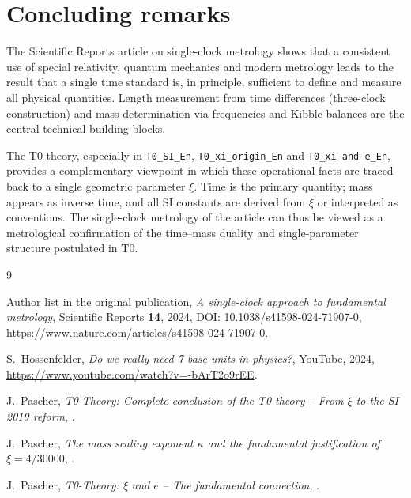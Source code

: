 \section{Concluding remarks}

The Scientific Reports article on single-clock metrology shows that a
consistent use of special relativity, quantum mechanics and modern metrology
leads to the result that a single time standard is, in principle, sufficient to
define and measure all physical quantities. Length measurement from time
differences (three-clock construction) and mass determination via frequencies
and Kibble balances are the central technical building blocks.

The T0 theory, especially in \texttt{T0\_SI\_En}, \texttt{T0\_xi\_origin\_En}
and \texttt{T0\_xi-and-e\_En}, provides a complementary viewpoint in which
these operational facts are traced back to a single geometric parameter $\xi$.
Time is the primary quantity; mass appears as inverse time, and all SI
constants are derived from $\xi$ or interpreted as conventions. The
single-clock metrology of the article can thus be viewed as a metrological
confirmation of the time–mass duality and single-parameter structure postulated
in T0.

\begin{thebibliography}{9}

Author list in the original publication,
\textit{A single-clock approach to fundamental metrology},
Scientific Reports \textbf{14}, 2024,
DOI: 10.1038/s41598-024-71907-0,
\url{https://www.nature.com/articles/s41598-024-71907-0}.

S.~Hossenfelder,
\textit{Do we really need 7 base units in physics?},
YouTube, 2024,
\url{https://www.youtube.com/watch?v=-bArT2o9rEE}.

J.~Pascher,
\textit{T0-Theory: Complete conclusion of the T0 theory – From $\xi$ to the SI 2019 reform},
.

J.~Pascher,
\textit{The mass scaling exponent $\kappa$ and the fundamental justification of $\xi = 4/30000$},
.

J.~Pascher,
\textit{T0-Theory: $\xi$ and $e$ – The fundamental connection},
.

\end{thebibliography}

